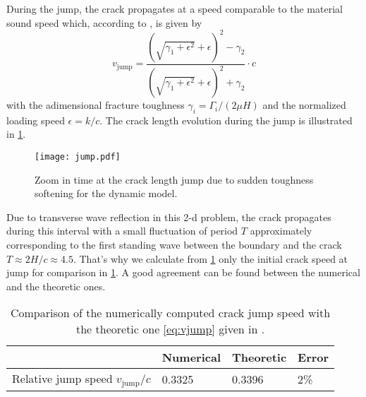 During the jump, the crack propagates at a speed comparable to the material sound speed which, according to \cite{DumouchelMarigoCharlotte:2008}, is given by
\begin{equation} \label{eq:vjump}
v_\mathrm{jump}=\frac{\left(\sqrt{\gamma_1+\epsilon^2}+\epsilon\right)^2-\gamma_2}{\left(\sqrt{\gamma_1+\epsilon^2}+\epsilon\right)^2+\gamma_2}\cdot c
\end{equation}
with the adimensional fracture toughness $\gamma_i=\Gamma_i/(2\mu H)$ and the normalized loading speed $\epsilon=k/c$. The crack length evolution during the jump is illustrated in \cref{fig:softGcqs_jump}.
\begin{figure}[htbp]
\centering
\texttt{[image: jump.pdf]}
\caption{Zoom in time at the crack length jump due to sudden toughness softening for the dynamic model.} \label{fig:softGcqs_jump}
\end{figure}
Due to transverse wave reflection in this 2-d problem, the crack propagates during this interval with a small fluctuation of period $T$ approximately corresponding to the first standing wave between the boundary and the crack $T\approx 2H/c\approx 4.5$. That's why we calculate from \cref{fig:softGcqs_jump} only the initial crack speed at jump for comparison in \cref{tab:compjumpv}. A good agreement can be found between the numerical and the theoretic ones.
\begin{table}[htbp]
\centering
\caption{Comparison of the numerically computed crack jump speed with the theoretic one \eqref{eq:vjump} given in \cite{DumouchelMarigoCharlotte:2008}.} \label{tab:compjumpv}
\begin{tabular}{llll} \toprule
& Numerical & Theoretic & Error \\ \midrule
Relative jump speed $v_\mathrm{jump}/c$ & 0.3325 & 0.3396 & 2\% \\ \bottomrule
\end{tabular}
\end{table}

